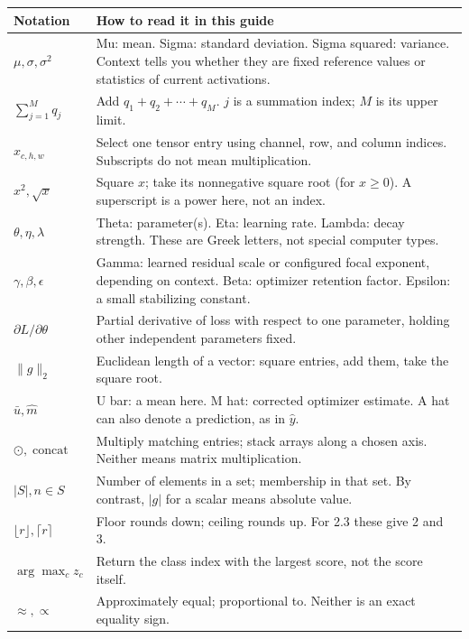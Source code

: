 \documentclass[11pt,letterpaper]{article}
\newcommand{\op}[1]{\operatorname{#1}}
\begin{document}
\begin{tabularx}{\linewidth}{@{}lY@{}}\toprule
\textbf{Notation} & \textbf{How to read it in this guide}\\\midrule
$\mu,\sigma,\sigma^2$ & Mu: mean. Sigma: standard deviation. Sigma squared: variance. Context tells you whether they are fixed reference values or statistics of current activations.\\
$\sum_{j=1}^{M}q_j$ & Add $q_1+q_2+\cdots+q_M$. $j$ is a summation index; $M$ is its upper limit.\\
$x_{c,h,w}$ & Select one tensor entry using channel, row, and column indices. Subscripts do not mean multiplication.\\
$x^2,\sqrt{x}$ & Square $x$; take its nonnegative square root (for $x\ge0$). A superscript is a power here, not an index.\\
$\theta,\eta,\lambda$ & Theta: parameter(s). Eta: learning rate. Lambda: decay strength. These are Greek letters, not special computer types.\\
$\gamma,\beta,\epsilon$ & Gamma: learned residual scale or configured focal exponent, depending on context. Beta: optimizer retention factor. Epsilon: a small stabilizing constant.\\
$\partial L/\partial\theta$ & Partial derivative of loss with respect to one parameter, holding other independent parameters fixed.\\
$\lVert g\rVert_2$ & Euclidean length of a vector: square entries, add them, take the square root.\\
$\bar u,\widehat m$ & U bar: a mean here. M hat: corrected optimizer estimate. A hat can also denote a prediction, as in $\widehat y$.\\
$\odot,\op{concat}$ & Multiply matching entries; stack arrays along a chosen axis. Neither means matrix multiplication.\\
$|S|,n\in S$ & Number of elements in a set; membership in that set. By contrast, $|g|$ for a scalar means absolute value.\\
$\lfloor r\rfloor,\lceil r\rceil$ & Floor rounds down; ceiling rounds up. For 2.3 these give 2 and 3.\\
$\arg\max_c z_c$ & Return the class index with the largest score, not the score itself.\\
$\approx,\propto$ & Approximately equal; proportional to. Neither is an exact equality sign.\\\bottomrule
\end{tabularx}
\end{document}
